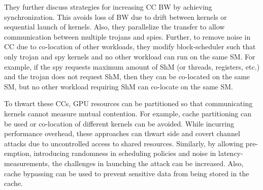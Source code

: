 They further discuss strategies for increasing CC BW by achieving synchronization. This avoids loss of BW due to drift between kernels or sequential launch of kernels. Also, they parallelize the transfer to allow communication between multiple trojans and spies. Further, to remove noise in CC due to co-location of other workloads, they modify block-scheduler such that only  trojan and spy kernels and no other workload can run on the same SM. For example, if the spy requests maximum amount of ShM (or threads, registers, etc.)  and the trojan does not request ShM, then they can be co-located on the same SM, but no other workload requiring ShM can co-locate on the same SM. 

To thwart these CCs, GPU resources can be partitioned so that communicating kernels cannot measure mutual contention. For example, cache partitioning  \cite{mittal2017SurveyCachePart} can be used or co-location of different kernels can be avoided. While incurring performance overhead, these approaches can thwart side and covert channel attacks due to uncontrolled access to shared resources. Similarly, by allowing pre-emption, introducing randomness in scheduling policies and noise in latency-measurements, the challenges in launching the attack can be increased. Also, cache bypassing \cite{mittal2016SurveyCacheBypassing} can be used to prevent sensitive data from being stored in the cache. 


  
  

  


  


 








  

  
  

   

